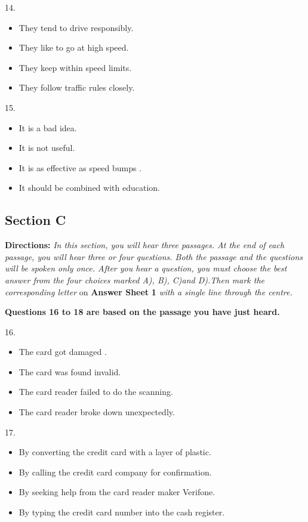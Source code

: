 \documentclass[UTF8,11pt]{ctexart}
\begin{document}
14.


\begin{itemize}[leftmargin=2em,itemsep=.2em,topsep=.4em]\item[A.] They tend to drive responsibly.
\item[B.] They like to go at high speed.
\item[C.] They keep within speed limits.
\item[D.] They follow traffic rules closely.
\end{itemize}

15.


\begin{itemize}[leftmargin=2em,itemsep=.2em,topsep=.4em]\item[A.] It is a bad idea.
\item[B.] It is not useful.
\item[C.] It is as effective as speed bumps .
\item[D.] It should be combined with education.
\end{itemize}

\subsection*{\textbf{Section C}}


\textbf{Directions:}\textit{ In this section, you will hear three passages. At the end of each passage, you will hear three or four} \textit{questions. Both the passage and the questions will be spoken only once. After you hear a question, you must choose} \textit{the best answer from the four choices marked A), B), C)and D).Then mark the corresponding letter} on\textbf{ Answer Sheet} \textbf{1}\textit{ with a single line through the centre.}


\textbf{Questions 16 to 18 are based on the passage you have just heard.}


16.


\begin{itemize}[leftmargin=2em,itemsep=.2em,topsep=.4em]\item[A.] The card got damaged .
\item[B.] The card was found invalid.
\item[C.] The card reader failed to do the scanning.
\item[D.] The card reader broke down unexpectedly.
\end{itemize}

17.


\begin{itemize}[leftmargin=2em,itemsep=.2em,topsep=.4em]\item[A.] By converting the credit card with a layer of plastic.
\item[B.] By calling the credit card company for confirmation.
\item[C.] By seeking help from the card reader maker Verifone.
\item[D.] By typing the credit card number into the cash register.
\end{itemize}
\end{document}
